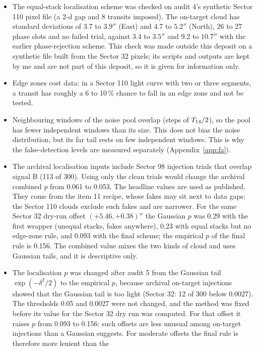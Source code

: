 \begin{itemize}
  only and a grouping of $n$ chosen after seeing the counts; both were corrected after audit 4.
\item The equal-stack localisation scheme was checked on audit 4's synthetic Sector 110 pixel file (a 2-d gap and 8
  transits imposed). The on-target cloud has standard deviations of 3.7 to $3.9''$ (East) and 4.7 to $5.2''$ (North),
  26 to 27 phase slots and no failed trial, against 3.4 to $3.5''$ and 9.2 to $10.7''$ with the earlier
  phase-rejection scheme. This check was made outside this deposit on a synthetic file built from the Sector 32 pixels;
  its scripts and outputs are kept by me and are not part of this deposit, so it is given for information only.
\item Edge zones cost data: in a Sector 110 light curve with two or three segments, a transit has roughly a 6 to 10\,\%
  chance to fall in an edge zone and not be tested.
\item Neighbouring windows of the noise pool overlap (steps of $T_{14}/2$), so the pool has fewer independent
  windows than its size. This does not bias the noise distribution, but its far tail rests on few independent windows.
  This is why the false-detection levels are measured separately (Appendix~\ref{app:fa}).
\item The archival localisation inputs include Sector 98 injection trials that overlap signal B (113 of 300). Using only
  the clean trials would change the archival combined $p$ from 0.061 to 0.053. The headline values are used as
  published. They come from the item 11 recipe, whose fakes may sit next to data gaps; the Sector 110 clouds exclude
  such fakes and are narrower. For the same Sector 32 dry-run offset $(+5.46, +0.38)''$ the Gaussian $p$ was 0.29 with
  the first wrapper (unequal stacks, fakes anywhere), 0.23 with equal stacks but no edge-zone rule, and 0.093 with the
  final scheme; the empirical $p$ of the final rule is 0.156. The combined value mixes the two kinds of cloud and uses
  Gaussian tails, and it is descriptive only.
\item The localisation $p$ was changed after audit 5 from the Gaussian tail $\exp(-\delta^2/2)$ to the empirical $p$,
  because archival on-target injections showed that the Gaussian tail is too light (Sector 32: 12 of 300 below
  0.0027). The thresholds 0.05 and 0.0027 were not changed, and the method was fixed before its value for the Sector 32
  dry run was computed. For that offset it raises $p$ from 0.093 to 0.156: such offsets are less unusual among
  on-target injections than a Gaussian suggests. For moderate offsets the final rule is therefore more lenient than the

\end{itemize}
